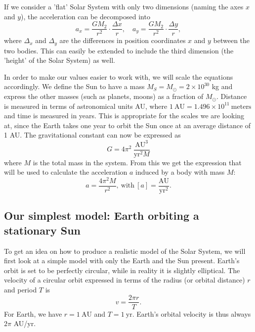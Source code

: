 \documentclass{emulateapj}
\begin{document}
If we consider a 'flat' Solar System with only two dimensions (naming the axes $x$ and $y$), the acceleration can be decomposed into
%
\begin{equation*}
    a_x = \frac{G M_2}{r^2}\cdot\frac{\Delta x}{r}, \quad a_y = \frac{G M_2}{r^2}\cdot\frac{\Delta y}{r},
\end{equation*}
%
where $\Delta_x$ and $\Delta_y$ are the differences in position coordinates $x$ and $y$ between the two bodies. This can easily be extended to include the third dimension (the 'height' of the Solar System) as well. 

In order to make our values easier to work with, we will scale the equations accordingly. We define the Sun to have a mass $M_S = M_\odot = 2\times 10^{30}$ kg and express the other masses (such as planets, moons) as a fraction of $M_\odot$. Distance is measured in terms of astronomical units AU, where $1 \ \textrm{AU} = 1.496 \times 10^{11} \ \textrm{meters}$ and time is measured in years. This is appropriate for the scales we are looking at, since the Earth takes one year to orbit the Sun once at an average distance of 1 AU. The gravitational constant can now be expressed as 
%
\begin{equation*}
G = 4\pi^2 \ \frac{\textrm{AU}^3}{\textrm{yr}^{2}M} 
\end{equation*}
%
where $M$ is the total mass in the system. From this we get the expression that will be used to calculate the acceleration $a$ induced by a body with mass $M$:
%
\begin{equation*}
a = \frac{4\pi^2 M}{r^2}, \ \textrm{with} \ [a] = \frac{\textrm{AU}}{\textrm{yr}^2}.
\end{equation*}


\subsection{Our simplest model: Earth orbiting a stationary Sun}
\label{subsec:simple}

To get an idea on how to produce a realistic model of the Solar System, we will first look at a simple model with only the Earth and the Sun present. Earth's orbit is set to be perfectly circular, while in reality it is slightly elliptical. The velocity of a circular orbit expressed in terms of the radius (or orbital distance) $r$ and period $T$ is
%
\begin{equation*}
    v = \frac{2\pi r}{T}.
\end{equation*}
%
For Earth, we have $r = 1 \ \textrm{AU}$ and $T = 1 \ \textrm{yr}$. Earth's orbital velocity is thus always $2\pi$ AU/yr.
\end{document}
